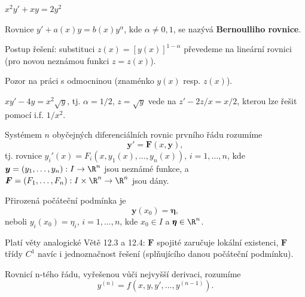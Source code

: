 \begin{priklad}
$x^{2}y' + xy = 2y^{2}$
\end{priklad}

\begin{definice}
Rovnice $y' + a(x)y = b(x)y^\alpha$, kde $\alpha \neq 0, 1$, se nazývá \textbf{Bernoulliho rovnice}.

Postup řešení: substituci $z(x) = [y(x)]^{1 - \alpha}$ převedeme na lineární rovnici (pro novou neznámou funkci $z = z(x)$).

Pozor na práci s odmocninou (znaménko $y(x)$ resp. $z(x)$).
\end{definice}

\begin{priklad}
$xy' - 4y = x^2\sqrt{y}$, tj. $\alpha = 1/2$, $z = \sqrt{y}$ vede na $z' - 2z/x = x/2$, kterou lze řešit pomocí i.f. $1/x^2$.
\end{priklad}

\begin{definice}
Systémem $n$ obyčejných diferenciálních rovnic prvního řádu rozumíme
\begin{equation}\label{6}
\boldsymbol{y}' = \boldsymbol{F} (x, \boldsymbol{y}),
\end{equation}
tj. rovnice $y_{i}'(x) = F_{i}(x,y_{1}(x),\ldots ,y_{n}(x))$, $i = 1,\dots ,n$, kde $\boldsymbol{y} = (y_{1},\ldots ,y_{n}):I\to \R^{n}$ jsou neznámé funkce, a $\boldsymbol{F} = (F_{1},\dots,F_{n}):I\times \R^{n}\rightarrow \R^{n}$ jsou dány.

Přirozená počáteční podmínka je
\begin{equation}\label{7}
\boldsymbol{y}(x_0) = \boldsymbol{\eta},
\end{equation}
neboli $y_{i}(x_{0}) = \eta_{i}$, $i = 1,\ldots ,n$, kde $x_0\in I$ a $\pmb{\eta}\in \R^n$.
\end{definice}

\begin{poznamka}
Platí věty analogické Větě 12.3 a 12.4: $\pmb{F}$ spojité zaručuje lokální existenci, $\pmb{F}$ třídy $C^1$ navíc i jednoznačnost řešení (splňujícího danou počáteční podmínku).
\end{poznamka}

\begin{definice}
Rovnicí n-tého řádu, vyřešenou vůči nejvyšší derivaci, rozumíme
\begin{equation}\label{8}
y^{(n)} = f \left(x, y, y', \dots, y^{(n - 1)}\right).
\end{equation}
\end{definice}

